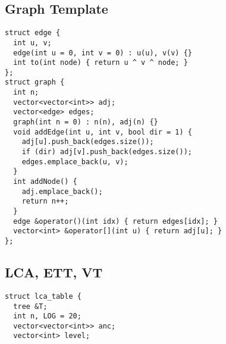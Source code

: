 \documentclass[FSZ,a4paper,onesided]{article}
\begin{document}
\begin{multicols*}{\COLS}
\subsection{Graph Template}
\begin{lstlisting}
struct edge {
  int u, v;
  edge(int u = 0, int v = 0) : u(u), v(v) {}
  int to(int node) { return u ^ v ^ node; }
};
struct graph {
  int n;
  vector<vector<int>> adj;
  vector<edge> edges;
  graph(int n = 0) : n(n), adj(n) {}
  void addEdge(int u, int v, bool dir = 1) {
    adj[u].push_back(edges.size());
    if (dir) adj[v].push_back(edges.size());
    edges.emplace_back(u, v);
  }
  int addNode() {
    adj.emplace_back();
    return n++;
  }
  edge &operator()(int idx) { return edges[idx]; }
  vector<int> &operator[](int u) { return adj[u]; }
};
\end{lstlisting}
\subsection{LCA, ETT, VT}
\begin{lstlisting}
struct lca_table {
  tree &T;
  int n, LOG = 20;
  vector<vector<int>> anc;
  vector<int> level;


\end{lstlisting}
\end{multicols*}
\end{document}
